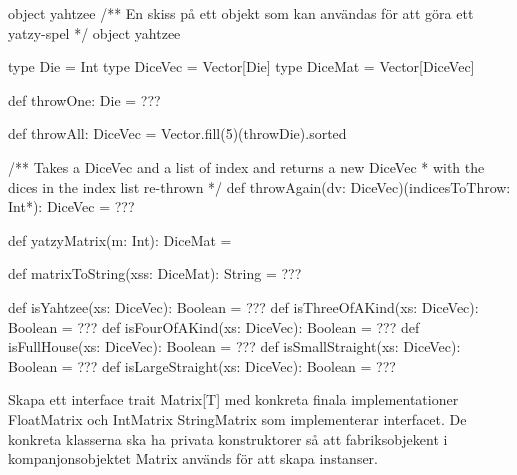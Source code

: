 \begin{ScalaSpec}{object yahtzee}
/** En skiss på ett objekt som kan användas för att göra ett yatzy-spel */
object yahtzee {
  type Die = Int
  type DiceVec = Vector[Die]
  type DiceMat = Vector[DiceVec]

  def throwOne: Die = ???
  
  def throwAll: DiceVec = Vector.fill(5)(throwDie).sorted

  /** Takes a DiceVec and a list of index and returns a new DiceVec 
    * with the dices in the index list re-thrown */
  def throwAgain(dv: DiceVec)(indicesToThrow: Int*): DiceVec = ???

  def yatzyMatrix(m: Int): DiceMat = 
  
  def matrixToString(xss: DiceMat): String = ???
  
  def isYahtzee(xs: DiceVec): Boolean = ???
  def isThreeOfAKind(xs: DiceVec): Boolean = ???
  def isFourOfAKind(xs: DiceVec): Boolean = ???
  def isFullHouse(xs: DiceVec): Boolean = ???
  def isSmallStraight(xs: DiceVec): Boolean = ???
  def isLargeStraight(xs: DiceVec): Boolean = ???
}
\end{ScalaSpec}


\AdvancedTasks %

\Task Skapa ett interface trait Matrix[T] med konkreta finala implementationer FloatMatrix och IntMatrix StringMatrix som implementerar interfacet. De konkreta klasserna ska ha privata konstruktorer så att fabriksobjekent i kompanjonsobjektet Matrix används för att skapa instanser.
    